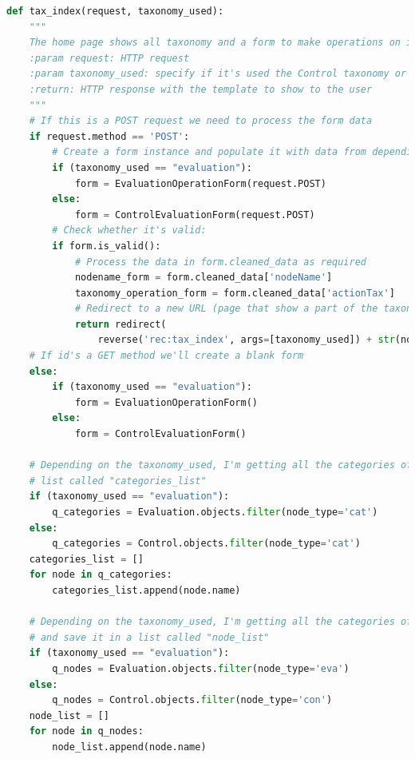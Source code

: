 \label{lst:view}
\begin{lstlisting}[language=Python, caption={Parti principali del codice delle View della soluzione per gestire la navigazione 
    delle tassonomie, quella delle Evaluation e quella dei Controlli}]
def tax_index(request, taxonomy_used):
    """
    The home page shows all taxonomy and a form to make operations on it.
    :param request: HTTP request
    :param taxonomy_used: specify if it's used the Control taxonomy or the Evaluation taxonomy
    :return: HTTP response with the template to show to the user
    """
    # If this is a POST request we need to process the form data
    if request.method == 'POST':
        # Create a form instance and populate it with data from depending on the taxonomy_used
        if (taxonomy_used == "evaluation"):
            form = EvaluationOperationForm(request.POST)
        else:
            form = ControlEvaluationForm(request.POST)
        # Check whether it's valid:
        if form.is_valid():
            # Process the data in form.cleaned_data as required
            nodename_form = form.cleaned_data['nodeName']
            taxonomy_operation_form = form.cleaned_data['actionTax']
            # Redirect to a new URL (page that show a part of the taxonomy, depending on the action user has chosen):
            return redirect(
                reverse('rec:tax_index', args=[taxonomy_used]) + str(nodename_form) + '_' + taxonomy_operation_form)
    # If id's a GET method we'll create a blank form
    else:
        if (taxonomy_used == "evaluation"):
            form = EvaluationOperationForm()
        else:
            form = ControlEvaluationForm()

    # Depending on the taxonomy_used, I'm getting all the categories of Evaluations or Controls taxonomy and save it in a
    # list called "categories_list"
    if (taxonomy_used == "evaluation"):
        q_categories = Evaluation.objects.filter(node_type='cat')
    else:
        q_categories = Control.objects.filter(node_type='cat')
    categories_list = []
    for node in q_categories:
        categories_list.append(node.name)

    # Depending on the taxonomy_used, I'm getting all the categories of Evaluations or Controls node in the taxonomy
    # and save it in a list called "node_list"
    if (taxonomy_used == "evaluation"):
        q_nodes = Evaluation.objects.filter(node_type='eva')
    else:
        q_nodes = Control.objects.filter(node_type='con')
    node_list = []
    for node in q_nodes:
        node_list.append(node.name)


\end{lstlisting}

